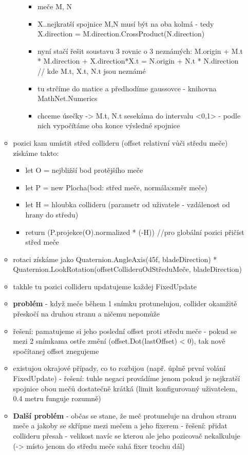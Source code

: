\begin{itemize}
\begin{itemize}
\begin{itemize}
\begin{itemize}
            \item meče M, N
            \item X..nejkratší spojnice M,N musí být na oba kolmá - tedy X.direction = M.direction.CrossProduct(N.direction)
            \item nyní stačí řešit soustavu 3 rovnic o 3 neznámých: M.origin + M.t * M.direction + X.direction*X.t = N.origin + N.t * N.direction // kde M.t, X.t, N.t jsou neznámé
            \item tu strčíme do matice a předhodíme gaussovce - knihovna MathNet.Numerics
            \item chceme úsečky -> M.t, N.t sesekáma do intervalu <0,1> - podle nich vypočítáme oba konce výsledné spojnice
          \end{itemize}
      \end{itemize}
    \item pozici kam umístit střed collideru (offset relativní vůči středu meče) získáme takto: 
      \begin{itemize}
        \item let O = nejbližší bod protějšího meče
        \item let P = new Plocha(bod: střed meče, normála:směr meče)
        \item let H = hloubka collideru (parametr od uživatele - vzdálenost od hrany do středu)
        \item return (P.projekce(O).normalized * (-H)) //pro globální pozici přičíst střed meče
      \end{itemize}
    \item rotaci získáme jako Quaternion.AngleAxis(45f, bladeDirection) * Quaternion.LookRotation(offsetCollideruOdStředuMeče, bladeDirection)
    \item takhle tu pozici collideru updatujeme každej FixedUpdate
    \item \textbf{problém} - když meče během 1 snímku protunelujou, collider okamžitě přeskočí na druhou stranu a ničemu nepomůže
    \item řešení: pamatujeme si jeho poslední offset proti středu meče - pokud se mezi 2 snímkama ostře změní (offset.Dot(lastOffset) < 0), tak nově spočítanej offset znegujeme
    \item existujou okrajové případy, co to rozbijou (např. úplně první volání FixedUpdate) - řešení: tuhle negaci provádíme jenom pokud je nejkratší spojnice obou mečů dostatečně krátká (limit konfigurovaný uživatelem, 0.4 metru funguje rozumně)
    \item \textbf{Další problém} - občas se stane, že meč protuneluje na druhou stranu meče a jakoby se skřípne mezi mečem a jeho fixerem - řešení: přidat collideru přesah - velikost navíc se kterou ale jeho pozicovač nekalkuluje (-> místo jenom do středu meče sahá fixer trochu dál)

\end{itemize}
\end{itemize}
